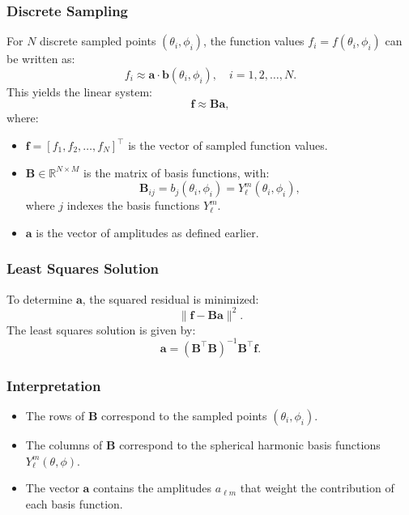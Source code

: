 \subsubsection*{Discrete Sampling}
For \( N \) discrete sampled points \( (\theta_i, \phi_i) \), the function values \( f_i = f(\theta_i, \phi_i) \) can be written as:
\[
f_i \approx \mathbf{a} \cdot \mathbf{b}(\theta_i, \phi_i), \quad i = 1, 2, \dots, N.
\]
This yields the linear system:
\[
\mathbf{f} \approx \mathbf{B} \mathbf{a},
\]
where:
\begin{itemize}
    \item \( \mathbf{f} = [f_1, f_2, \dots, f_N]^\top \) is the vector of sampled function values.
    \item \( \mathbf{B} \in \mathbb{R}^{N \times M} \) is the matrix of basis functions, with:
    \[
    \mathbf{B}_{ij} = b_j(\theta_i, \phi_i) = Y_\ell^m(\theta_i, \phi_i),
    \]
    where \( j \) indexes the basis functions \( Y_\ell^m \).
    \item \( \mathbf{a} \) is the vector of amplitudes as defined earlier.
\end{itemize}

\subsubsection*{Least Squares Solution}
To determine \( \mathbf{a} \), the squared residual is minimized:
\[
\|\mathbf{f} - \mathbf{B} \mathbf{a}\|^2.
\]
The least squares solution is given by:
\[
\mathbf{a} = (\mathbf{B}^\top \mathbf{B})^{-1} \mathbf{B}^\top \mathbf{f}.
\]

\subsubsection*{Interpretation}
\begin{itemize}
    \item The rows of \( \mathbf{B} \) correspond to the sampled points \( (\theta_i, \phi_i) \).
    \item The columns of \( \mathbf{B} \) correspond to the spherical harmonic basis functions \( Y_\ell^m(\theta, \phi) \).
    \item The vector \( \mathbf{a} \) contains the amplitudes \( a_{\ell m} \) that weight the contribution of each basis function.
\end{itemize}

\endinput  %